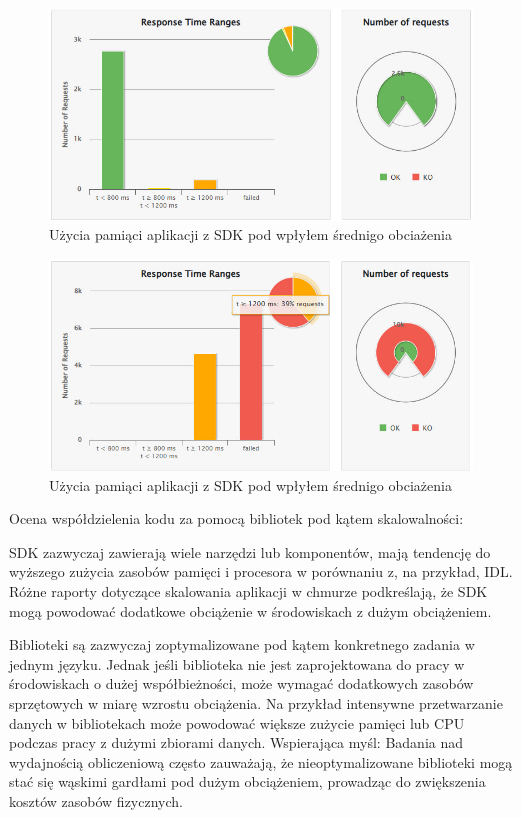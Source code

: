 \documentclass[runningheads,12pt]{llncs}
\begin{document}
\begin{figure}
    \includegraphics[width=\linewidth]{images/library-gatling-middle-graph.jpg}
    \caption{Użycia pamiąci aplikacji z SDK pod wpłyłem średnigo obciażenia} \label{fig1}
\end{figure}

\begin{figure}
    \includegraphics[width=\linewidth]{images/library-gatling-high-graph.jpg}
    \caption{Użycia pamiąci aplikacji z SDK pod wpłyłem średnigo obciażenia} \label{fig1}
\end{figure}

\newpage

Ocena współdzielenia kodu za pomocą bibliotek pod kątem skalowalności:

SDK zazwyczaj zawierają wiele narzędzi lub komponentów, mają tendencję do wyższego zużycia zasobów pamięci i procesora w porównaniu z, na przykład, IDL. Różne raporty dotyczące skalowania aplikacji w chmurze podkreślają, że SDK mogą powodować dodatkowe obciążenie w środowiskach z dużym obciążeniem. ~\cite[para 3]{azure2020}

Biblioteki są zazwyczaj zoptymalizowane pod kątem konkretnego zadania w jednym języku. Jednak jeśli biblioteka nie jest zaprojektowana do pracy w środowiskach o dużej współbieżności, może wymagać dodatkowych zasobów sprzętowych w miarę wzrostu obciążenia. Na przykład intensywne przetwarzanie danych w bibliotekach może powodować większe zużycie pamięci lub CPU podczas pracy z dużymi zbiorami danych. Wspierająca myśl: Badania nad wydajnością obliczeniową często zauważają, że nieoptymalizowane biblioteki mogą stać się wąskimi gardłami pod dużym obciążeniem, prowadząc do zwiększenia kosztów zasobów fizycznych. ~\cite[p. 192]{fowler2012patterns}
\end{document}
